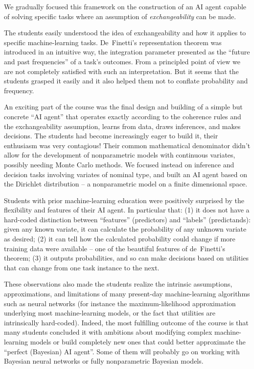We gradually focused this framework on the construction of an AI agent capable of solving specific tasks where an assumption of \emph{exchangeability} can be made.

The students easily understood the idea of exchangeability and how it applies to specific machine-learning tasks. De~Finetti's representation theorem was introduced in an intuitive way, the integration parameter presented as the ``future and past frequencies'' of a task's outcomes. From a principled point of view we are not completely satisfied with such an interpretation. But it seems that the students grasped it easily and it also helped them not to conflate probability and frequency.

An exciting part of the course was the final design and building of a simple but concrete ``AI agent'' that operates exactly according to the coherence rules and the exchangeability assumption, learns from data, draws inferences, and makes decisions. The students had become increasingly eager to build it, their enthusiasm was very contagious! Their common mathematical denominator didn't allow for the development of nonparametric models with continuous variates, possibly needing Monte Carlo methods. We focused instead on inference and decision tasks involving variates of nominal type, and built an AI agent based on the Dirichlet distribution -- a nonparametric model on a finite dimensional space.

Students with prior machine-learning education were positively surprised by the flexibility and features of their AI agent. In particular that: (1) it does not have a hard-coded distinction between ``features'' (predictors) and ``labels'' (predictands): given any known variate, it can calculate the probability of any unknown variate as desired; (2) it can tell how the calculated probability could change if more training data were available -- one of the beautiful features of de~Finetti's theorem; (3) it outputs probabilities, and so can make decisions based on utilities that can change from one task instance to the next.

These observations also made the students realize the intrinsic assumptions, approximations, and limitations of many present-day machine-learning algorithms such as neural networks (for instance the maximum-likelihood approximation underlying most machine-learning models, or the fact that utilities are intrinsically hard-coded). Indeed, the most fulfilling outcome of the course is that many students concluded it with ambitions about modifying complex machine-learning models or build completely new ones that could better approximate the ``perfect (Bayesian) AI agent''. Some of them will probably go on working with Bayesian neural networks or fully nonparametric Bayesian models.

